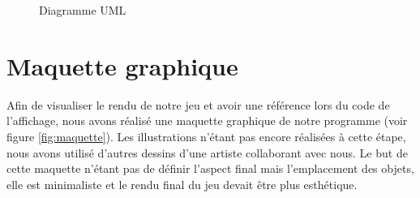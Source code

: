 \documentclass[12pt]{report}
\begin{document}
		\begin{figure}
			\caption{Diagramme UML}
			\label{fig:UML}
		\end{figure}

    \section{Maquette graphique}

	    Afin de visualiser le rendu de notre jeu et avoir une référence lors du code de l'affichage, nous avons réalisé une maquette graphique de notre programme (voir figure \ref{fig:maquette}). Les illustrations n'étant pas encore réalisées à cette étape, nous avons utilisé d'autres dessins d'une artiste collaborant avec nous. Le but de cette maquette n'étant pas de définir l'aspect final mais l'emplacement des objets, elle est minimaliste et le rendu final du jeu devait être plus esthétique.\\[1.5cm]
\end{document}
